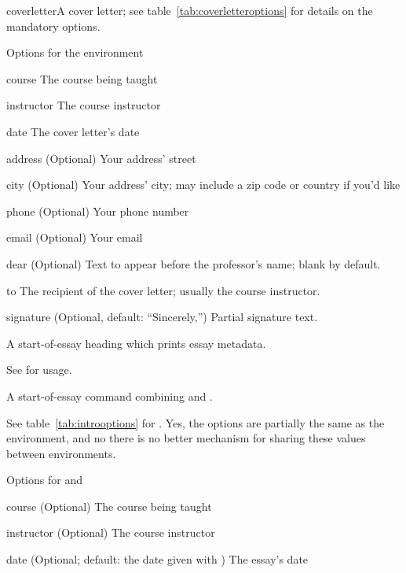 \documentclass{ltxdoc}
\begin{document}
\begin{macro}{coverletter}\AfterLastParam A cover letter; see
table~\ref{tab:coverletteroptions} for details on the mandatory options.

\begin{table}[h]
	\centering
	\caption{Options for the  environment}
	\label{tab:coverletteroptions}
	\begin{options}
		\item[course] The course being taught
		\item[instructor] The course instructor
		\item[date] The cover letter's date
		\item[address] (Optional) Your address' street
		\item[city] (Optional) Your address' city; may include a zip
			code or country if you'd like
		\item[phone] (Optional) Your phone number
		\item[email] (Optional) Your email
		\item[dear] (Optional) Text to appear before the professor's
			name; blank by default.
		\item[to] The recipient of the cover letter; usually the
			course instructor.
		\item[signature] (Optional, default: ``Sincerely,'') Partial
			signature text.
	\end{options}
\end{table}
\end{macro}

\begin{macro}{\heading}\AfterLastParam A start-of-essay
heading which prints essay metadata.

See  for usage.
\end{macro}

\begin{macro}{\intro}\AfterLastParam A start-of-essay command
combining  and .

See table~\ref{tab:introoptions} for . Yes, the options are
partially the same as the  environment, and no there is no
better mechanism for sharing these values between environments.

\begin{table}[h]
	\centering
	\caption{Options for  and }
	\label{tab:introoptions}
	\begin{options}
		\item[course] (Optional) The course being taught
		\item[instructor] (Optional) The course instructor
		\item[date] (Optional; default: the date given with
			) The essay's date
	\end{options}
\end{table}
\end{macro}
\end{document}

